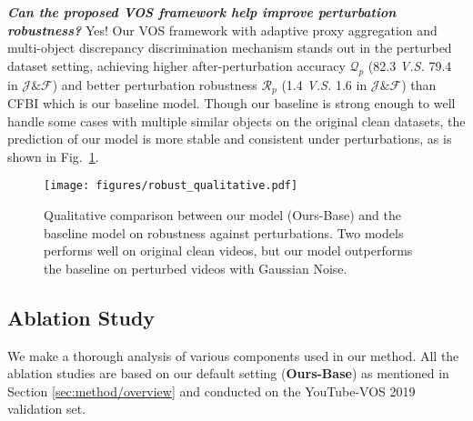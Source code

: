 \documentclass[sigconf]{acmart}
\begin{document}
\noindent\textbf{\textit{Can the proposed VOS framework help improve perturbation robustness?}} Yes! Our VOS framework with adaptive proxy aggregation and multi-object discrepancy discrimination mechanism stands out in the perturbed dataset setting, achieving higher after-perturbation accuracy $\mathcal{Q}_p$ (82.3 \textit{V.S.} 79.4 in $\mathcal{J}\&\mathcal{F}$) and better perturbation robustness $\mathcal{R}_p$ (1.4 \textit{V.S.} 1.6 in $\mathcal{J}\&\mathcal{F}$) than CFBI which is our baseline model. Though our baseline is strong enough to well handle some cases with multiple similar objects on the original clean datasets, the prediction of our model is more stable and consistent under perturbations, as is shown in Fig.~\ref{fig:qualitative_robust}.
\begin{figure}[t]
\centering
\texttt{[image: figures/robust\_qualitative.pdf]}

\caption{Qualitative comparison between our model (Ours-Base) and the baseline model \cite{yang2020collaborative} on robustness against perturbations. Two models performs well on original clean videos, but our model outperforms the baseline on perturbed videos with Gaussian Noise.}
\label{fig:qualitative_robust}                   
\end{figure}
 
\subsection{Ablation Study}
\label{sec:ablation_study}
We make a thorough analysis of various components used in our method.
All the ablation studies 
    are based on our default setting (\textbf{Ours-Base}) as mentioned in Section \ref{sec:method/overview} and conducted on the YouTube-VOS 2019 validation set.
\end{document}
